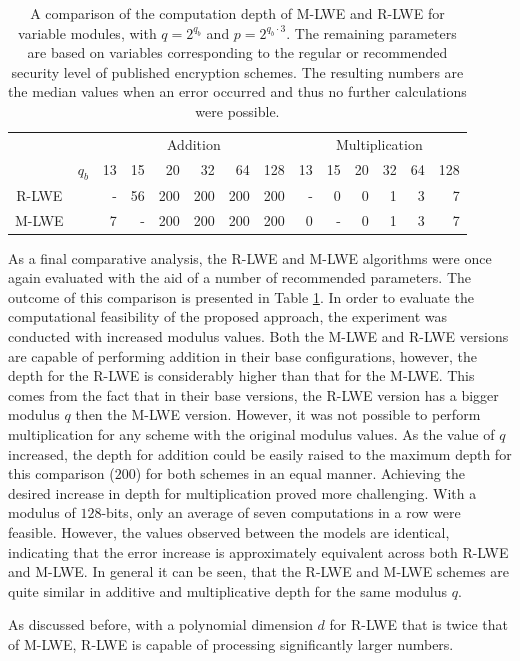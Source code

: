 \begin{table}[htp]
  \centering
  \caption[M-LWE and R-LWE computation depth comparison]{A comparison of the computation depth of M-LWE and R-LWE for variable modules, with $q = 2^{q_b}$ and $p=2^{q_b\cdot 3}$. The remaining parameters are based on variables corresponding to the regular or recommended security level of published encryption schemes. The resulting numbers are the median values when an error occurred and thus no further calculations were possible.}
  
  \begin{tabular}{|cc|rrrrrr|rrrrrr|}
    \toprule
                                       &       & \multicolumn{6}{|c|}{Addition} & \multicolumn{6}{|c|}{Multiplication}                                                        \\
                                       & $q_b$ & 13                             & 15                                   & 20  & 32  & 64  & 128 & 13 & 15 & 20 & 32 & 64 & 128 \\
    \midrule
    R-LWE  \cite{CyrstalsKyber}        &       & -                              & 56                                   & 200 & 200 & 200 & 200 & -  & 0  & 0  & 1  & 3  & 7   \\
    M-LWE  \cite{PracticalKeyExchange} &       & 7                              & -                                    & 200 & 200 & 200 & 200 & 0  & -  & 0  & 1  & 3  & 7   \\
    \bottomrule
  \end{tabular}
  \label{table:depthComparison}
\end{table}

As a final comparative analysis, the R-LWE and M-LWE algorithms were once again evaluated with the aid of a number of recommended parameters. The outcome of this comparison is presented in Table \ref{table:depthComparison}. In order to evaluate the computational feasibility of the proposed approach, the experiment was conducted with increased modulus values. Both the M-LWE and R-LWE versions are capable of performing addition in their base configurations, however, the depth for the R-LWE is considerably higher than that for the M-LWE. This comes from the fact that in their base versions, the R-LWE version has a bigger modulus $q$ then the M-LWE version. However, it was not possible to perform multiplication for any scheme with the original modulus values. As the value of $q$ increased, the depth for addition could be easily raised to the maximum depth for this comparison ($200$) for both schemes in an equal manner. Achieving the desired increase in depth for multiplication proved more challenging. With a modulus of $128$-bits, only an average of seven computations in a row were feasible. However, the values observed between the models are identical, indicating that the error increase is approximately equivalent across both R-LWE and M-LWE. In general it can be seen, that the R-LWE and M-LWE schemes are quite similar in additive and multiplicative depth for the same modulus $q$.

As discussed before, with a polynomial dimension $d$ for R-LWE that is twice that of M-LWE, R-LWE is capable of processing significantly larger numbers.